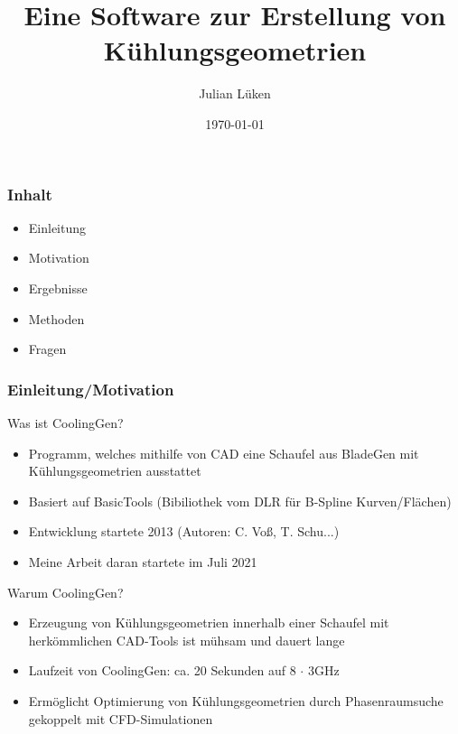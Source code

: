 \documentclass[8pt, aspectratio=169]{beamer}
\title[CoolingGen]{Eine Software zur Erstellung von Kühlungsgeometrien}
\author{Julian Lüken}
\date{\today}
\begin{document}
\begin{frame}[plain]
	\maketitle
\end{frame}

\begin{frame}
	\frametitle{Inhalt}
	\vspace{-1cm}\hspace{-0.5cm}
	\begin{minipage}[t]{\textwidth}
		\begin{itemize}
			\item Einleitung
			\item Motivation
			\item Ergebnisse
			\item Methoden
			\item Fragen
		\end{itemize}
	\end{minipage}
	\vfill
\end{frame}

\begin{frame}
	\frametitle{Einleitung/Motivation}
	\vspace{-1cm}\hspace{-0.5cm}
	\begin{minipage}[t]{\textwidth}
		Was ist CoolingGen?
		\begin{itemize}
			\item Programm, welches mithilfe von CAD eine Schaufel aus BladeGen mit Kühlungsgeometrien ausstattet
			\item Basiert auf BasicTools (Bibiliothek vom DLR für B-Spline Kurven/Flächen)
			\item Entwicklung startete 2013 (Autoren: C. Voß, T. Schu...)
			\item Meine Arbeit daran startete im Juli 2021
		\end{itemize}
		\vspace{0.5cm}
		Warum CoolingGen?
		\begin{itemize}
			\item Erzeugung von Kühlungsgeometrien innerhalb einer Schaufel mit herkömmlichen CAD-Tools ist mühsam und dauert lange
			\item Laufzeit von CoolingGen: ca. 20 Sekunden auf 8 $\cdot$ 3GHz
			\item Ermöglicht Optimierung von Kühlungsgeometrien durch Phasenraumsuche gekoppelt mit CFD-Simulationen
		\end{itemize}

	\end{minipage}
	\vfill
\end{frame}
\end{document}
